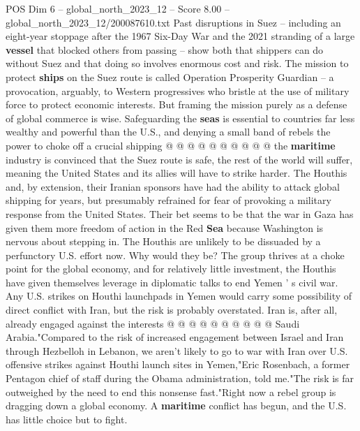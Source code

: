 \begin{textsample}{POS Dim 6 – global\_north\_2023\_12 – Score 8.00 – global\_north\_2023\_12/200087610.txt}
Past disruptions in Suez -- including an eight-year stoppage after the 1967 Six-Day War and the 2021 stranding of a large \textbf{vessel} that blocked others from passing -- show both that shippers can do without Suez and that doing so involves enormous cost and risk.
The mission to protect \textbf{ships} on the Suez route is called Operation Prosperity Guardian -- a provocation, arguably, to Western progressives who bristle at the use of military force to protect economic interests.
But framing the mission purely as a defense of global commerce is wise.
Safeguarding the \textbf{seas} is essential to countries far less wealthy and powerful than the U.S., and denying a small band of rebels the power to choke off a crucial shipping @ @ @ @ @ @ @ @ @ @ the \textbf{maritime} industry is convinced that the Suez route is safe, the rest of the world will suffer, meaning the United States and its allies will have to strike harder.
The Houthis and, by extension, their Iranian sponsors have had the ability to attack global shipping for years, but presumably refrained for fear of provoking a military response from the United States.
Their bet seems to be that the war in Gaza has given them more freedom of action in the Red \textbf{Sea} because Washington is nervous about stepping in.
The Houthis are unlikely to be dissuaded by a perfunctory U.S. effort now.
Why would they be?
The group thrives at a choke point for the global economy, and for relatively little investment, the Houthis have given themselves leverage in diplomatic talks to end Yemen ' s civil war.
Any U.S. strikes on Houthi launchpads in Yemen would carry some possibility of direct conflict with Iran, but the risk is probably overstated.
Iran is, after all, already engaged against the interests @ @ @ @ @ @ @ @ @ @ Saudi Arabia."Compared to the risk of increased engagement between Israel and Iran through Hezbelloh in Lebanon, we aren't likely to go to war with Iran over U.S. offensive strikes against Houthi launch sites in Yemen,"Eric Rosenbach, a former Pentagon chief of staff during the Obama administration, told me."The risk is far outweighed by the need to end this nonsense fast."Right now a rebel group is dragging down a global economy.
A \textbf{maritime} conflict has begun, and the U.S. has little choice but to fight.

\end{textsample}
